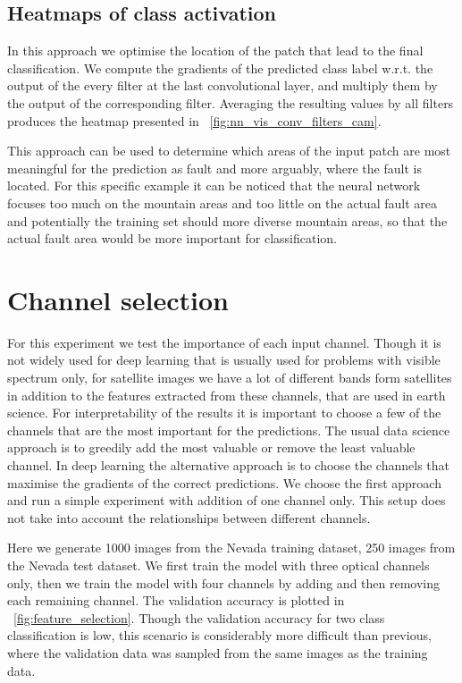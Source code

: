\documentclass[11pt,a4paper]{article}
\begin{document}
\subsection{Heatmaps of class activation}
In this approach we optimise the location of the patch that lead to the final classification. We compute the gradients
of the predicted class label w.r.t. the output of the every filter at the last convolutional layer, and multiply them by
the output of the corresponding filter. Averaging the resulting values by all filters produces the heatmap presented in
\figurename~\ref{fig:nn_vis_conv_filters_cam}.

This approach can be used to determine which areas of the input patch are most meaningful for the prediction as fault
and more arguably, where the fault is located. For this specific example it can be noticed that the neural network focuses
too much on the mountain areas and too little on the actual fault area and potentially the training set should more diverse
mountain areas, so that the actual fault area would be more important for classification.

\section{Channel selection}
For this experiment we test the importance of each input channel. Though it is not widely used for deep learning that is
usually used for problems with visible spectrum only, for satellite images we have a lot of different bands form satellites
in addition to the features extracted from these channels, that are used in earth science. For interpretability of the
results it is important to choose a few of the channels that are the most important for the predictions. The usual data
science approach is to greedily add the most valuable or remove the least valuable channel. In deep learning the alternative
approach is to choose the channels that maximise the gradients of the correct predictions. We choose the first approach
and run a simple experiment with addition of one channel only. This setup does not take into account the relationships
between different channels.

Here we generate 1000 images from the Nevada training dataset, 250 images from the Nevada test dataset. We first train
the model with three optical channels only, then we train the model with four channels by adding and then removing each
remaining channel. The validation accuracy is plotted in \figurename~\ref{fig:feature_selection}. Though the validation
accuracy for two class classification is low, this scenario is considerably more difficult than previous, where the
validation data was sampled from the same images as the training data.
\end{document}
